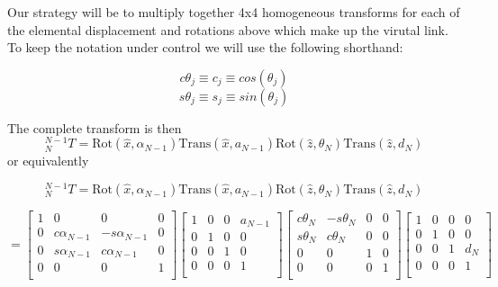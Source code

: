 Our strategy will be to multiply together 4x4 homogeneous transforms for each of the elemental displacement and rotations above which make up the virutal link.   To keep the notation under control we will use the following shorthand:

\[
 c\theta_j \equiv c_j \equiv cos(\theta_j)
\]
\[
s\theta_j \equiv s_j \equiv sin(\theta_j)
\]


The complete transform is then
\[
^{N-1}_NT =  \mathrm{Rot}(\hat{x},\alpha_{N-1})\mathrm{Trans}(\hat{x},a_{N-1})\mathrm{Rot}(\hat{z}, \theta_N)\mathrm{Trans}(\hat{z}, d_N)
\]
or equivalently

\[
^{N-1}_NT =  \mathrm{Rot}(\hat{x},\alpha_{N-1})\mathrm{Trans}(\hat{x},a_{N-1})\mathrm{Rot}(\hat{z}, \theta_N)\mathrm{Trans}(\hat{z}, d_N)
\]

\[
= \left[
   \begin{array}{cccc}
    1     &     0     &     0     &      0   \\
    0     &     c\alpha_{N-1}     &     -s\alpha_{N-1}     &      0   \\
    0     &     s\alpha_{N-1}     &      c\alpha_{N-1}     &      0   \\
    0     &     0     &     0     &      1   \\
   \end{array}
  \right ]
   \left[
   \begin{array}{cccc}
    1     &     0     &     0     &      a_{N-1}   \\
    0     &     1     &     0     &      0   \\
    0     &     0     &     1     &      0   \\
    0     &     0     &     0     &      1   \\
   \end{array}
  \right ]
   \left[
   \begin{array}{cccc}
    c\theta_N     &     -s\theta_N    &     0     &      0   \\
    s\theta_N     &      c\theta_N    &     0     &      0   \\
    0     &     0     &     1     &      0   \\
    0     &     0     &     0     &      1   \\
   \end{array}
  \right ]
   \left[
   \begin{array}{cccc}
    1     &     0     &     0     &      0   \\
    0     &     1     &     0     &      0   \\
    0     &     0     &     1     &      d_N   \\
    0     &     0     &     0     &      1   \\
   \end{array}
  \right ]
  \]


